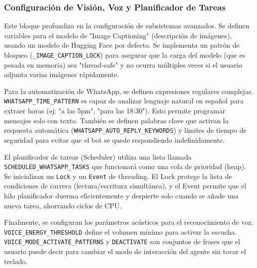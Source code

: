\documentclass[letterpaper,12pt]{article}
\begin{document}
\subsubsection{Configuración de Visión, Voz y Planificador de Tareas}

Este bloque profundiza en la configuración de subsistemas avanzados. Se definen variables para el modelo de "Image Captioning" (descripción de imágenes), usando un modelo de Hugging Face por defecto. Se implementa un patrón de bloqueo (\texttt{\_IMAGE\_CAPTION\_LOCK}) para asegurar que la carga del modelo (que es pesada en memoria) sea "thread-safe" y no ocurra múltiples veces si el usuario adjunta varias imágenes rápidamente.

Para la automatización de WhatsApp, se definen expresiones regulares complejas. \texttt{WHATSAPP\_TIME\_PATTERN} es capaz de analizar lenguaje natural en español para extraer horas (ej: "a las 5pm", "para las 18:30"). Esto permite programar mensajes solo con texto. También se definen palabras clave que activan la respuesta automática (\texttt{WHATSAPP\_AUTO\_REPLY\_KEYWORDS}) y límites de tiempo de seguridad para evitar que el bot se quede respondiendo indefinidamente.

El planificador de tareas (Scheduler) utiliza una lista llamada \texttt{SCHEDULED\_WHATSAPP\_TASKS} que funcionará como una cola de prioridad (heap). Se inicializan un \texttt{Lock} y un \texttt{Event} de threading. El Lock protege la lista de condiciones de carrera (lectura/escritura simultánea), y el Event permite que el hilo planificador duerma eficientemente y despierte solo cuando se añade una nueva tarea, ahorrando ciclos de CPU.

Finalmente, se configuran los parámetros acústicos para el reconocimiento de voz. \texttt{VOICE\_ENERGY\_THRESHOLD} define el volumen mínimo para activar la escucha. \texttt{VOICE\_MODE\_ACTIVATE\_PATTERNS} y \texttt{DEACTIVATE} son conjuntos de frases que el usuario puede decir para cambiar el modo de interacción del agente sin tocar el teclado.
\end{document}
